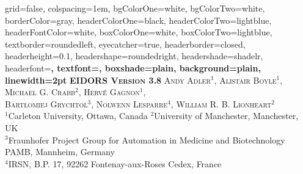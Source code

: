 \documentclass[portrait,final,a0paper,fontscale=0.277]{baposter}
\begin{document}


\begin{poster}%
  {
  grid=false,
  colspacing=1em,
  bgColorOne=white,
  bgColorTwo=white,
  borderColor=gray,
  headerColorOne=black,
  headerColorTwo=lightblue,
  headerFontColor=white,
  boxColorOne=white,
  boxColorTwo=lightblue,
  textborder=roundedleft,
  eyecatcher=true,
  headerborder=closed,
  headerheight=0.1\textheight,
  headershape=roundedright,
  headershade=shadelr,
  headerfont=\Large\bf\textsc, %
  textfont={\setlength{\parindent}{1.5em}},
  boxshade=plain,
  background=plain,
  linewidth=2pt
  }
  {
  }
  {\bf\textsc{EIDORS Version 3.8}}
  {\large \textsc{Andy Adler$^1$, Alistair Boyle$^1$, Michael G. Crabb$^2$,
        Herv\'e Gagnon$^1$, \\
        Bart{\l}omiej Grychtol$^3$,
     Nolwenn Lesparre$^4$, William R. B. Lionheart$^2$}\\
    \small
    $^1$Carleton University, Ottawa, Canada \;\;\;\;
    $^2$University of Manchester, Manchester, UK\\
    $^3$Fraunhofer Project Group for Automation in Medicine and Biotechnology PAMB, Mannheim, Germany\\
    $^4$IRSN, B.P. 17, 92262 Fontenay-aux-Roses Cedex, France
  }
  {%
  }


\end{poster}
\end{document}
